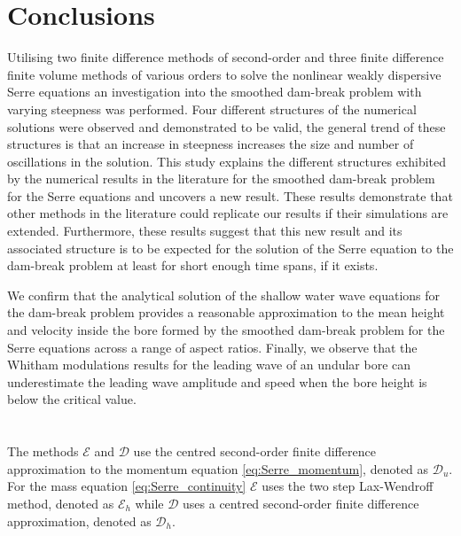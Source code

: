 \documentclass[times]{elsarticle}
\begin{document}
\section{Conclusions}
\label{section:Conclusions}
Utilising two finite difference methods of second-order and three finite difference finite volume methods of various orders to solve the nonlinear weakly dispersive Serre equations an investigation into the smoothed dam-break problem with varying steepness was performed. Four different structures of the numerical solutions were observed and demonstrated to be valid, the general trend of these structures is that an increase in steepness increases the size and number of oscillations in the solution. This study explains the different structures exhibited by the numerical results in the literature for the smoothed dam-break problem for the Serre equations and uncovers a new result. These results demonstrate that other methods in the literature could replicate our results if their simulations are extended. Furthermore, these results suggest that this new result and its associated structure is to be expected for the solution of the Serre equation to the dam-break problem at least for short enough time spans, if it exists.

We confirm that the analytical solution of the shallow water wave equations for the dam-break problem provides a reasonable approximation to the mean height and velocity inside the bore formed by the smoothed dam-break problem for the Serre equations across a range of aspect ratios. Finally, we observe that the Whitham modulations results for the leading wave of an undular bore can underestimate the leading wave amplitude and speed when the bore height is below the critical value.




\newpage
\appendix{}
\label{sec:appendix}
\section{}
The methods $\mathcal{E}$ and $\mathcal{D}$ use the centred second-order finite difference approximation to the momentum equation \eqref{eq:Serre_momentum}, denoted as $\mathcal{D}_u$. For the mass equation \eqref{eq:Serre_continuity} $\mathcal{E}$ uses the two step Lax-Wendroff method, denoted as $\mathcal{E}_h$ while $\mathcal{D}$ uses a centred second-order finite difference approximation, denoted as $\mathcal{D}_h$.
\end{document}
